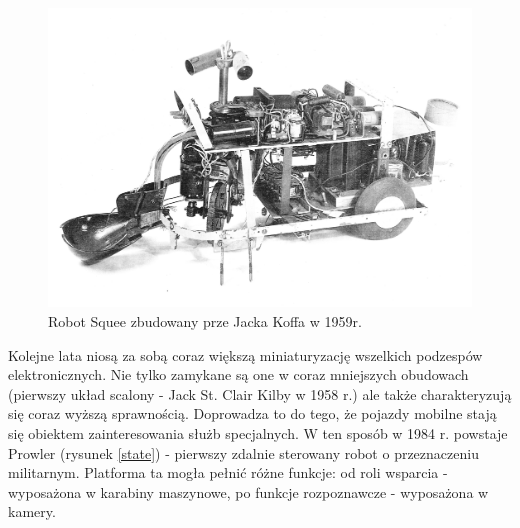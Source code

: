   \begin{figure}[H]
    \begin{center}
      \includegraphics[scale=0.4]{imgs/Squee.jpg}
 \caption[Robot \textit{Squee}]{\small{Robot Squee zbudowany prze Jacka Koffa w 1959r.}\footnotemark}
        \label{squee}
    \end{center}
  \end{figure}

Kolejne lata niosą za sobą coraz większą miniaturyzację wszelkich podzespów elektronicznych. Nie tylko zamykane są one w coraz mniejszych obudowach (pierwszy układ scalony - Jack St. Clair Kilby w 1958 r.) ale także charakteryzują się coraz wyższą sprawnością. Doprowadza to do tego, że pojazdy mobilne stają się obiektem zainteresowania służb specjalnych. W ten sposób w 1984 r. powstaje Prowler (rysunek \ref{state}) - pierwszy zdalnie sterowany robot o przeznaczeniu militarnym. Platforma ta mogła pełnić różne funkcje: od roli wsparcia - wyposażona w karabiny maszynowe, po funkcje rozpoznawcze - wyposażona w kamery.

